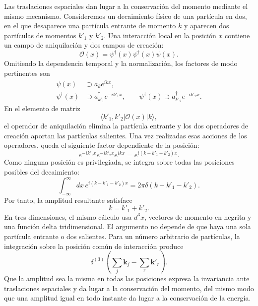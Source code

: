 Las traslaciones espaciales dan lugar a la conservación del momento mediante el mismo mecanismo. Consideremos un decaimiento físico de una partícula en dos, en el que desaparece una partícula entrante de momento \(k\) y aparecen dos partículas de momentos \(k'_1\) y \(k'_2\). Una interacción local en la posición \(x\) contiene un campo de aniquilación y dos campos de creación:
\begin{equation}
\mathcal{O}(x)=\psi^\dagger(x)\psi^\dagger(x)\psi(x).
\end{equation}
Omitiendo la dependencia temporal y la normalización, los factores de modo pertinentes son
\begin{align}
\psi(x)&\supset a_k e^{ikx},
\\
\psi^\dagger(x)&\supset a_{k'_1}^\dagger e^{-ik'_1x},
\qquad
\psi^\dagger(x)\supset a_{k'_2}^\dagger e^{-ik'_2x}.
\end{align}
En el elemento de matriz
\begin{equation}
\langle k'_1,k'_2|\mathcal{O}(x)|k\rangle,
\end{equation}
el operador de aniquilación elimina la partícula entrante y los dos operadores de creación aportan las partículas salientes. Una vez realizadas esas acciones de los operadores, queda el siguiente factor dependiente de la posición:
\begin{equation}
e^{-ik'_1x}e^{-ik'_2x}e^{ikx}
=e^{i(k-k'_1-k'_2)x}.
\end{equation}
Como ninguna posición es privilegiada, se integra sobre todas las posiciones posibles del decaimiento:
\begin{equation}
\int_{-\infty}^{\infty}dx\,
e^{i(k-k'_1-k'_2)x}
=2\pi\delta(k-k'_1-k'_2).
\end{equation}
Por tanto, la amplitud resultante satisface
\begin{equation}
k=k'_1+k'_2.
\end{equation}
En tres dimensiones, el mismo cálculo usa \(d^3x\), vectores de momento en negrita y una función delta tridimensional. El argumento no depende de que haya una sola partícula entrante o dos salientes. Para un número arbitrario de partículas, la integración sobre la posición común de interacción produce
\begin{equation}
\delta^{(3)}\!\left(
\sum_j\mathbf{k}_j-\sum_r\mathbf{k}'_r
\right).
\end{equation}
Que la amplitud sea la misma en todas las posiciones expresa la invariancia ante traslaciones espaciales y da lugar a la conservación del momento, del mismo modo que una amplitud igual en todo instante da lugar a la conservación de la energía.

